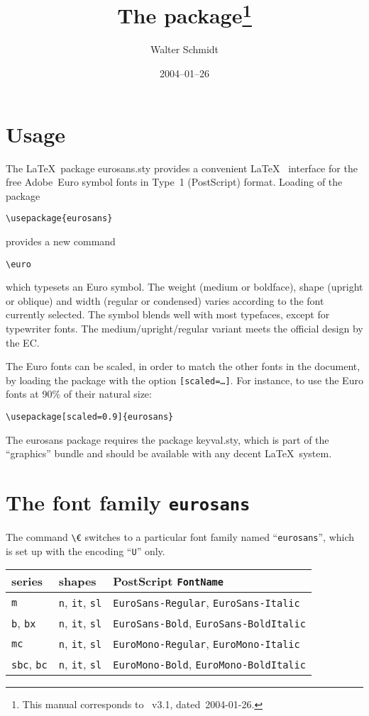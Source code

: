 \documentclass[DIV=9, pagesize=auto]{scrartcl}
\title{The \pkg{eurosans} package\thanks{This manual corresponds to \pkg{eurosans}~v3.1, dated~2004-01-26.}}
\author{Walter Schmidt\\\mail{w.a.schmidt@gmx.net}}
\date{2004--01--26}
\makeatletter
\newcommand*{\pkg}[1]{\textsf{#1}}
\newcommand*{\cs}[1]{\texttt{\textbackslash#1}}
\newcommand*{\cmd}[1]{\cs{\expandafter\@gobble\string#1}}
\newcommand*{\opt}[1]{\texttt{#1}}
\makeatother
\begin{document}
\maketitle

\section{Usage}

The \LaTeX\ package \pkg{eurosans.sty} provides a convenient \LaTeX\ %
interface for the free Adobe~Euro symbol fonts in Type~1
(PostScript) format.  Loading of the package
%
\begin{verbatim}
\usepackage{eurosans}
\end{verbatim}
%
provides a new command
%
\begin{verbatim}
\euro
\end{verbatim}
%
which typesets an Euro symbol.  The weight (medium or
boldface), shape (upright or oblique) and width (regular or
condensed) varies according to the font currently selected.
The symbol blends well with most typefaces, except for
typewriter fonts.  The medium/upright/regular variant meets
the official design by the EC.

The \pkg{Euro} fonts can be scaled, in order to match the other
fonts in the document, by loading the package with the
option \opt{[scaled=\ldots]}.  For instance, to use the \pkg{Euro} fonts at
90\% of their natural size:
%
\begin{verbatim}
\usepackage[scaled=0.9]{eurosans}
\end{verbatim}
%
The \pkg{eurosans} package requires the package \pkg{keyval.sty}, which
is part of the ``\pkg{graphics}'' bundle and should be available
with any decent \LaTeX\ system.


\section{The font family \texttt{eurosans}}

The command \cmd{\euro} switches to a particular font family named
``\texttt{eurosans}'', which is set up with the encoding ``\texttt{U}'' only.


\medskip
\begin{tabular}{@{}lll@{}}
  \toprule
  series                    & shapes                               & PostScript \texttt{FontName}                         \\
  \midrule
  \texttt{m}                & \texttt{n}, \texttt{it}, \texttt{sl} & \texttt{EuroSans-Regular}, \texttt{EuroSans-Italic}  \\
  \texttt{b}, \texttt{bx}   & \texttt{n}, \texttt{it}, \texttt{sl} & \texttt{EuroSans-Bold}, \texttt{EuroSans-BoldItalic} \\
  \texttt{mc}               & \texttt{n}, \texttt{it}, \texttt{sl} & \texttt{EuroMono-Regular}, \texttt{EuroMono-Italic}  \\
  \texttt{sbc}, \texttt{bc} & \texttt{n}, \texttt{it}, \texttt{sl} & \texttt{EuroMono-Bold}, \texttt{EuroMono-BoldItalic} \\
  \bottomrule
\end{tabular}
\end{document}
